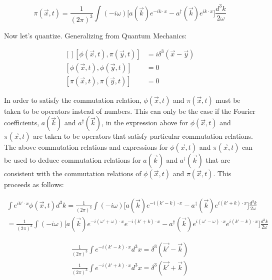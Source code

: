 \documentclass{article}
\begin{document}
    \begin{equation}
        \pi (\vec{x}, t) = \frac{1}{(2 \pi)^3} \int (- i \omega) \Big[ a(\vec{k}) e^{-i k \cdot x} - a^{\dag}(\vec{k}) e^{i k \cdot x} \Big] \frac{d^3k}{2 \omega}
    \end{equation}

    Now let's quantize. Generalizing from Quantum Mechanics:

    \begin{equation}
        \begin{aligned}[]
            [\phi (\vec{x}, t),\pi (\vec{y}, t)] & = i \delta^{3}(\vec{x} - \vec{y}) \\
            [\phi (\vec{x}, t), \phi (\vec{y}, t)] & = 0 \\
            [\pi (\vec{x}, t), \pi (\vec{y}, t)] & = 0
        \end{aligned}
    \end{equation}

    In order to satisfy the commutation relation, $\phi (\vec{x}, t)$ and $\pi (\vec{x}, t)$ must be taken to be operators instead of numbers.
    This can only be the case if the Fourier coefficients, $a(\vec{k})$ and $a^{\dag}(\vec{k})$, in the expression above for $\phi (\vec{x}, t)$
    and $\pi (\vec{x}, t)$ are taken to be operators that satisfy particular commutation relations. The above commutation relations and expressions
    for $\phi (\vec{x}, t)$ and $\pi (\vec{x}, t)$ can be used to deduce commutation relations for $a(\vec{k})$ and $a^{\dag}(\vec{k})$ that are
    consistent with the commutation relations of $\phi (\vec{x}, t)$ and $\pi (\vec{x}, t)$. This proceeds as follows:

    \begin{equation}
        \begin{aligned}
            \int e^{i k' \cdot x} \phi (\vec{x}, t) d^{3}k  = \frac{1}{(2 \pi)^3} \int (- i \omega) \Big[ a(\vec{k}) e^{-i (k' - k) \cdot x} - a^{\dag}(\vec{k}) e^{i (k' + k) \cdot x} \Big] \frac{d^3k}{2 \omega} \\
            = \frac{1}{(2 \pi)^3} \int (- i \omega) \Big[ a(\vec{k}) e^{-i (\omega' + \omega) \cdot x} e^{-i (k' + k) \cdot x} - a^{\dag}(\vec{k}) e^{i (\omega' - \omega) \cdot x} e^{i (k' - k) \cdot x} \Big] \frac{d^3k}{2 \omega}
        \end{aligned}
    \end{equation}

    \begin{equation}
        \begin{aligned}
            \frac{1}{(2 \pi)^3} \int e^{-i (k' - k) \cdot x} d^{3}x = \delta^{3} (\vec{k'} - \vec{k}) \\
            \frac{1}{(2 \pi)^3} \int e^{-i (k' + k) \cdot x} d^{3}x = \delta^{3} (\vec{k'} + \vec{k})
        \end{aligned}
    \end{equation}
\end{document}
